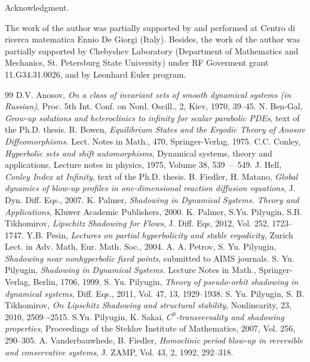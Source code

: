 \documentclass[11pt]{article}
\theoremstyle{Mystyle}
\begin{document}
\begin{section}{Acknowledgment.}

The work of the author was partially supported by and performed at Centro di ricerca matematica Ennio De Giorgi (Italy). Besides, the work of the author was partially supported by Chebyshev Laboratory (Department of Mathematics and Mechanics, St. Petersburg State University) under RF Goverment grant 11.G34.31.0026, and by Leonhard Euler program.

\end{section}

\begin{thebibliography}{99}
 D.V. Anosov, \textit{On a class of invariant sets of smooth dynamical systems (in Russian)}, Proc. 5th Int. Conf. on Nonl. Oscill., 2, Kiev, 1970, 39--45.
 N. Ben-Gal, \textit{Grow-up solutions and heteroclinics to infinity for scalar parabolic PDEs}, text of the Ph.D. thesis.
 R. Bowen, \textit{Equilibrium States and the Ergodic Theory of Anosov Diffeomorphisms.}
Lect. Notes in Math., 470, Springer-Verlag, 1975. 
 C.C. Conley, \textit{Hyperbolic sets and shift automorphisms}, Dynamical systems, theory and applications, Lecture notes in physics, 1975, Volume 38, 539~--~549.
 J. Hell, \textit{Conley Index at Infinity}, text of the Ph.D. thesis.
 B. Fiedler, H. Matano, \textit{Global dynamics of blow-up profiles in one-dimensional reaction diffusion equations}, J. Dyn. Diff. Eqs., 2007.
 K. Palmer, \textit{Shadowing in Dynamical Systems. Theory and Applications}, Kluwer Academic Publishers, 2000.
 K. Palmer, S.Yu. Pilyugin, S.B. Tikhomirov, \textit{Lipschitz Shadowing for Flows},
J. Diff. Eqs, 2012, Vol. 252, 1723--1747.
 Y.B. Pesin, \textit{Lectures on partial hyperbolicity and stable ergodicity,} Zurich Lect. in Adv. Math, Eur. Math. Soc., 2004.
 A. A. Petrov, S. Yu. Pilyugin, \textit{Shadowing near nonhyperbolic fixed points}, submitted to AIMS journals. 
 S. Yu. Pilyugin, \textit{Shadowing in Dynamical Systems.} Lecture Notes in Math., Springer-Verlag, Berlin, 1706, 1999.
 S. Yu. Pilyugin, \textit{Theory of pseudo-orbit shadowing in dynamical systems}, Diff. Eqs., 2011, Vol. 47, 13, 1929--1938. 
 S. Yu. Pilyugin, S. B. Tikhomirov, \textit{On Lipschitz Shadowing and structural stability}, Nonlinearity, 23, 2010, 2509–-2515.
 S.Yu. Pilyugin, K. Sakai, \textit{$C^0$-transversality and shadowing properties}, Proceedings of the Steklov Institute of Mathematics, 2007, Vol. 256, 290--305. 
 A. Vanderbauwhede, B. Fiedler, \textit{Homoclinic period blow-up in reversible and conservative systems}, J. ZAMP, Vol. 43, 2, 1992, 292--318.
\end{thebibliography}
\end{document}
